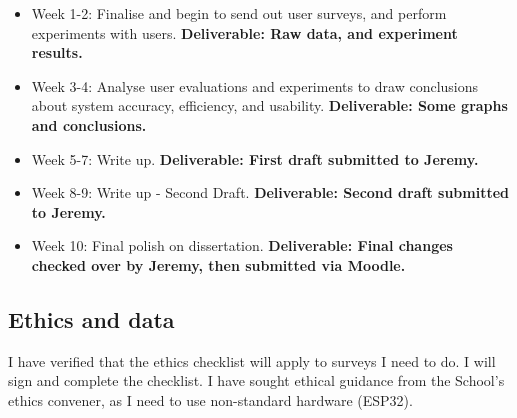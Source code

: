 \documentclass[11pt]{article}
\begin{document}
\begin{itemize}
    \setlength\itemsep{0.1em}
    \item
      Week 1-2: Finalise and begin to send out user surveys, and perform experiments 
      with users. \textbf{Deliverable: Raw data, and experiment results.}
    \item
      Week 3-4: Analyse user evaluations and experiments to draw conclusions about
      system accuracy, efficiency, and usability. \textbf{Deliverable: Some graphs 
      and conclusions.}
    \item
      Week 5-7: Write up. \textbf{Deliverable: First draft submitted to
      Jeremy.}
    \item
      Week 8-9: Write up - Second Draft. \textbf{Deliverable: Second draft submitted to
      Jeremy.}
    \item
      Week 10: Final polish on dissertation. \textbf{Deliverable: Final changes checked 
      over by Jeremy, then submitted via Moodle.}
    \end{itemize}

    
\subsection{Ethics and data}\label{ethics}

I have verified that the ethics checklist will apply to surveys I need to do. I will sign and complete the checklist.
I have sought ethical guidance from the School's ethics convener, as I need to use non-standard hardware (ESP32).
\end{document}
